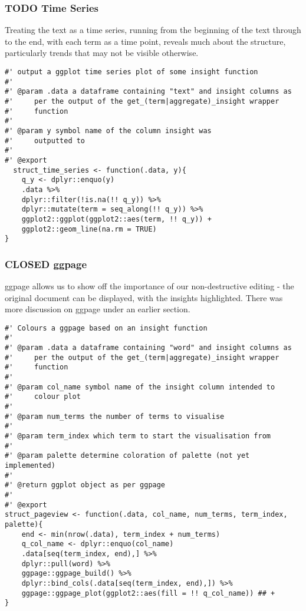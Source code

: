 \documentclass[a4paper, 11pt]{article}
\begin{document}
\subsubsection{{\bfseries\sffamily TODO} Time Series}
\label{sec:orgb6e68a8}
Treating the text as a time series, running from the beginning of the
text through to the end, with each term as a time point, reveals much
about the structure, particularly trends that may not be visible
otherwise.

\begin{verbatim}
#' output a ggplot time series plot of some insight function
#'
#' @param .data a dataframe containing "text" and insight columns as
#'     per the output of the get_(term|aggregate)_insight wrapper
#'     function
#' 
#' @param y symbol name of the column insight was
#'     outputted to
#'
#' @export
  struct_time_series <- function(.data, y){
    q_y <- dplyr::enquo(y)
    .data %>%
	dplyr::filter(!is.na(!! q_y)) %>%
	dplyr::mutate(term = seq_along(!! q_y)) %>%
	ggplot2::ggplot(ggplot2::aes(term, !! q_y)) +
	ggplot2::geom_line(na.rm = TRUE)
}
\end{verbatim}

\subsubsection{{\bfseries\sffamily CLOSED} ggpage}
\label{sec:orga9c6f79}
ggpage allows us to show off the importance of our non-destructive
editing - the original document can be displayed, with the insights
highlighted. There was more discussion on ggpage under an earlier section.

\begin{verbatim}
#' Colours a ggpage based on an insight function
#'
#' @param .data a dataframe containing "word" and insight columns as
#'     per the output of the get_(term|aggregate)_insight wrapper
#'     function
#'
#' @param col_name symbol name of the insight column intended to
#'     colour plot
#'
#' @param num_terms the number of terms to visualise
#'
#' @param term_index which term to start the visualisation from
#'
#' @param palette determine coloration of palette (not yet implemented)
#' 
#' @return ggplot object as per ggpage
#'
#' @export
struct_pageview <- function(.data, col_name, num_terms, term_index, palette){
    end <- min(nrow(.data), term_index + num_terms)
    q_col_name <- dplyr::enquo(col_name)
    .data[seq(term_index, end),] %>%
	dplyr::pull(word) %>%
	ggpage::ggpage_build() %>%
	dplyr::bind_cols(.data[seq(term_index, end),]) %>% 
	ggpage::ggpage_plot(ggplot2::aes(fill = !! q_col_name)) ## +
} 
\end{verbatim}
\end{document}
